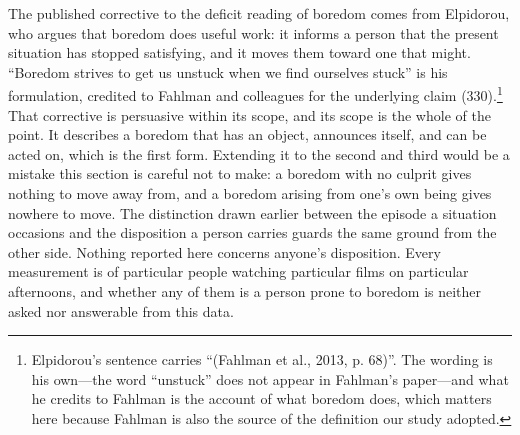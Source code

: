 The published corrective to the deficit reading of boredom comes from Elpidorou, who argues
that boredom does useful work: it informs a person that the present situation has stopped
satisfying, and it moves them toward one that might. ``Boredom strives to get us unstuck when we find ourselves stuck'' is his formulation, credited to
Fahlman and colleagues for the underlying claim (330).\footnote{Elpidorou's sentence carries
``(Fahlman et al., 2013, p. 68)''. The wording is his own---the word ``unstuck'' does not appear
in Fahlman's paper---and what he credits to Fahlman is the account of what boredom does, which
matters here because Fahlman is also the source of the definition our study adopted.} That
corrective is persuasive within its scope, and its scope is the whole of the point. It describes
a boredom that has an object, announces itself, and can be acted on, which is the first form.
Extending it to the second and third would be a mistake this section is careful not to make: a
boredom with no culprit gives nothing to move away from, and a boredom arising from one's own
being gives nowhere to move. The distinction drawn earlier between the episode a situation
occasions and the disposition a person carries guards the same ground from the other side.
Nothing reported here concerns anyone's disposition. Every measurement is of particular people
watching particular films on particular afternoons, and whether any of them is a person prone
to boredom is neither asked nor answerable from this data.
